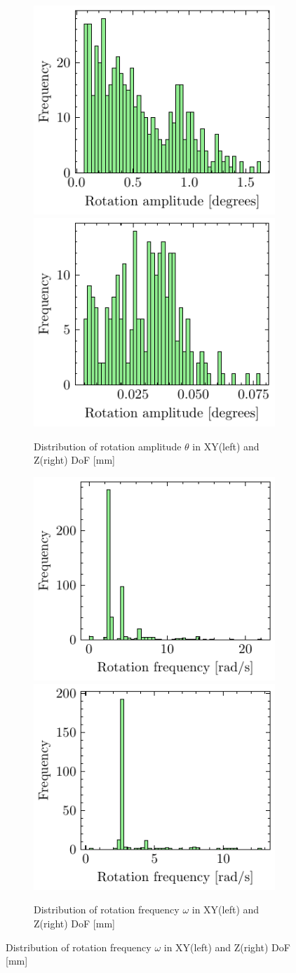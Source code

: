 \begin{figure}[H]
    \begin{subfigure}{\linewidth}
    \includegraphics[width=.5\linewidth]{images/fig_chapter4/data_dist/7.pdf}\hfill
    \includegraphics[width=.5\linewidth]{images/fig_chapter4/data_dist/8.pdf}
    \caption{Distribution of rotation amplitude $ \theta $ in XY(left) and Z(right) DoF [mm]}
    \end{subfigure}\par\medskip
    
    \begin{subfigure}{\linewidth}
    \includegraphics[width=.5\linewidth]{images/fig_chapter4/data_dist/9.pdf}\hfill
    \includegraphics[width=.5\linewidth]{images/fig_chapter4/data_dist/10.pdf}
    \caption{Distribution of rotation frequency $ \omega $ in XY(left) and Z(right) DoF [mm]}
    \end{subfigure}\par\medskip
    

\end{figure}
